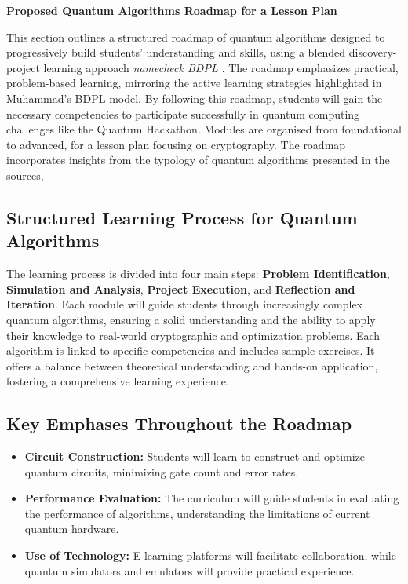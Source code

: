 \textbf{Proposed Quantum Algorithms Roadmap for a Lesson Plan}

This section outlines a structured roadmap of quantum algorithms designed to progressively build students' understanding 
and skills, using a blended discovery-project learning approach \emph{namecheck BDPL \cite{muhammad:2020}}. 
The roadmap emphasizes practical, problem-based learning, mirroring the active learning strategies highlighted in Muhammad’s BDPL model. 
By following this roadmap, students will gain the necessary competencies to participate successfully in quantum computing challenges like the Quantum Hackathon.
Modules are organised from foundational to advanced, for a lesson plan focusing on cryptography. 
The roadmap incorporates insights from the typology of quantum algorithms presented in the sources, 

\subsection{Structured Learning Process for Quantum Algorithms}

The learning process is divided into four main steps: \textbf{Problem Identification}, \textbf{Simulation and Analysis}, 
\textbf{Project Execution}, and \textbf{Reflection and Iteration}. 
Each module will guide students through increasingly complex quantum algorithms, ensuring a solid understanding and the 
ability to apply their knowledge to real-world cryptographic and optimization problems.
Each algorithm is linked to specific competencies and includes sample exercises. 
It offers a balance between theoretical understanding and hands-on application, fostering a comprehensive learning experience.

\subsection{Key Emphases Throughout the Roadmap}
\begin{itemize}
    \item \textbf{Circuit Construction:} Students will learn to construct and optimize quantum circuits, minimizing gate count and error rates.
    \item \textbf{Performance Evaluation:} The curriculum will guide students in evaluating the performance of algorithms, understanding the limitations of current quantum hardware.
    \item \textbf{Use of Technology:} E-learning platforms will facilitate collaboration, while quantum simulators and emulators will provide practical experience.
\end{itemize}

